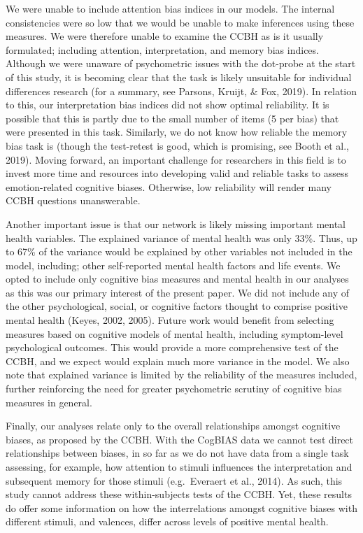 \documentclass[
  english,
  man,floatsintext]{apa6}
\begin{document}
We were unable to include attention bias indices in our models. The internal consistencies were so low that we would be unable to make inferences using these measures. We were therefore unable to examine the CCBH as is it usually formulated; including attention, interpretation, and memory bias indices. Although we were unaware of psychometric issues with the dot-probe at the start of this study, it is becoming clear that the task is likely unsuitable for individual differences research (for a summary, see Parsons, Kruijt, \& Fox, 2019). In relation to this, our interpretation bias indices did not show optimal reliability. It is possible that this is partly due to the small number of items (5 per bias) that were presented in this task. Similarly, we do not know how reliable the memory bias task is (though the test-retest is good, which is promising, see Booth et al., 2019). Moving forward, an important challenge for researchers in this field is to invest more time and resources into developing valid and reliable tasks to assess emotion-related cognitive biases. Otherwise, low reliability will render many CCBH questions unanswerable.

Another important issue is that our network is likely missing important mental health variables. The explained variance of mental health was only 33\%. Thus, up to 67\% of the variance would be explained by other variables not included in the model, including; other self-reported mental health factors and life events. We opted to include only cognitive bias measures and mental health in our analyses as this was our primary interest of the present paper. We did not include any of the other psychological, social, or cognitive factors thought to comprise positive mental health (Keyes, 2002, 2005). Future work would benefit from selecting measures based on cognitive models of mental health, including symptom-level psychological outcomes. This would provide a more comprehensive test of the CCBH, and we expect would explain much more variance in the model. We also note that explained variance is limited by the reliability of the measures included, further reinforcing the need for greater psychometric scrutiny of cognitive bias measures in general.

Finally, our analyses relate only to the overall relationships amongst cognitive biases, as proposed by the CCBH. With the CogBIAS data we cannot test direct relationships between biases, in so far as we do not have data from a single task assessing, for example, how attention to stimuli influences the interpretation and subsequent memory for those stimuli (e.g.~Everaert et al., 2014). As such, this study cannot address these within-subjects tests of the CCBH. Yet, these results do offer some information on how the interrelations amongst cognitive biases with different stimuli, and valences, differ across levels of positive mental health.
\end{document}
